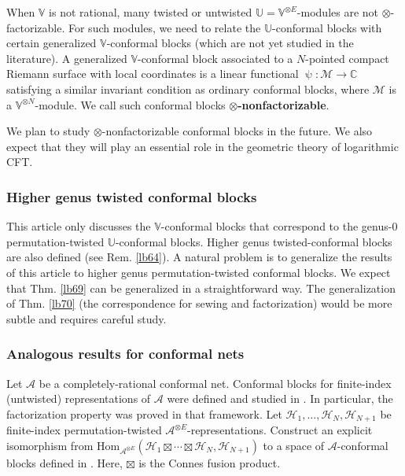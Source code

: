 \documentclass[11pt,b5paper,notitlepage]{article}
\theoremstyle{definition}
\theoremstyle{plain}
\newcommand{\mc}{\mathcal}
\newcommand{\Hom}{\mathrm{Hom}}
\newcommand{\Vbb}{\mathbb V}
\newcommand{\Ubb}{\mathbb U}
\newcommand{\Cbb}{\mathbb C}
\numberwithin{equation}{subsection}
\begin{document}
	

When $\Vbb$ is not rational, many twisted or untwisted  $\Ubb=\Vbb^{\otimes E}$-modules are not $\otimes$-factorizable. For such modules, we need to relate the $\Ubb$-conformal blocks with certain generalized $\Vbb$-conformal blocks (which are not yet studied in the literature). A generalized $\Vbb$-conformal block associated to a $N$-pointed compact Riemann surface with local coordinates is a linear functional $\uppsi:\mc M\rightarrow\Cbb$ satisfying a similar invariant condition as ordinary conformal blocks, where $\mc M$ is a $\Vbb^{\otimes N}$-module. We call such conformal blocks \textbf{$\otimes$-nonfactorizable}. 

We plan to study $\otimes$-nonfactorizable conformal blocks in the future. We also expect that they will play an essential role in the geometric theory of logarithmic CFT.








\subsubsection*{Higher genus twisted conformal blocks}

This article only discusses the $\Vbb$-conformal blocks that correspond to the genus-$0$ permutation-twisted $\Ubb$-conformal blocks. Higher genus twisted-conformal blocks are also defined (see Rem. \ref{lb64}). A natural problem is to generalize the results of this article to higher genus permutation-twisted conformal blocks. We expect that Thm. \ref{lb69} can be generalized in a straightforward way. The generalization of Thm. \ref{lb70} (the correspondence for sewing and factorization) would be more subtle and requires careful study.


\subsubsection*{Analogous results for conformal nets}


Let $\mc A$ be a completely-rational conformal net. Conformal blocks for finite-index (untwisted) representations of $\mc A$ were defined and studied in \cite{BDH17}. In particular, the factorization property was proved in that framework. Let $\mc H_1,\dots,\mc H_N,\mc H_{N+1}$ be finite-index permutation-twisted $\mc A^{\otimes E}$-representations. Construct an explicit isomorphism from $\Hom_{\mc A^{\otimes E}}(\mc H_1\boxtimes\cdots\boxtimes\mc H_N,\mc H_{N+1})$ to a space of $\mc A$-conformal blocks defined in \cite{BDH17}. Here, $\boxtimes$ is the Connes fusion product.
\end{document}
